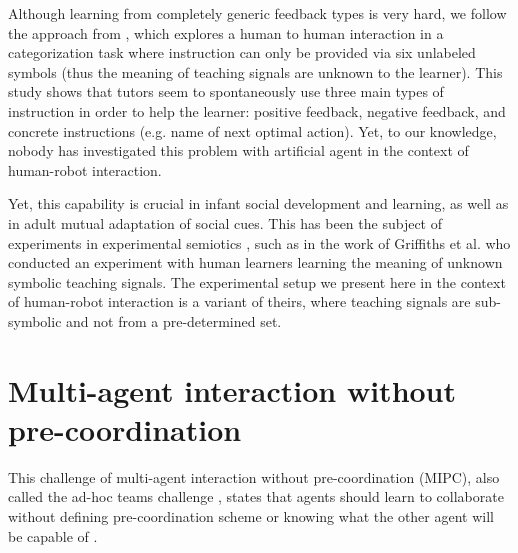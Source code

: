 Although learning from completely generic feedback types is very hard, we follow the approach from \cite{griffiths2012bottom}, which explores a human to human interaction in a categorization task where instruction can only be provided via six unlabeled symbols (thus the meaning of teaching signals are unknown to the learner). This study shows that tutors seem to spontaneously use three main types of instruction in order to help the learner: positive feedback, negative feedback, and concrete instructions (e.g. name of next optimal action). Yet, to our knowledge, nobody has investigated this problem with artificial agent in the context of human-robot interaction.

Yet, this capability is crucial in infant social development and learning, as well as in adult mutual adaptation of social cues. This has been the subject of experiments in experimental semiotics \cite{galantucci2009experimental}, such as in the work of Griffiths et al. \cite{griffiths2012bottom} who conducted an experiment with human learners learning the meaning of unknown symbolic teaching signals. The experimental setup we present here in the context of human-robot interaction is a variant of theirs, where teaching signals are sub-symbolic and not from a pre-determined set.


\section{Multi-agent interaction without pre-coordination}

This challenge of multi-agent interaction without pre-coordination (MIPC), also called the ad-hoc teams challenge \cite{stone2010ad}, states that agents should learn to collaborate without defining pre-coordination scheme or knowing what the other agent will be capable of \cite{bowling2005coordination,gil2006dynamically,stone2010ad}. 


